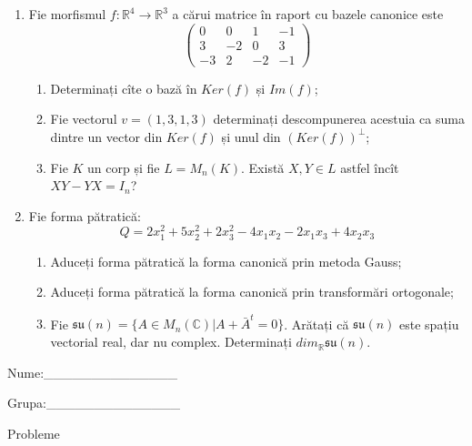 \documentclass{article}
\begin{document}
\begin{enumerate}
 \item Fie morfismul $f:\mathbb{R}^4 \to \mathbb{R}^3$ a cărui matrice în raport cu bazele canonice este
$$\begin{pmatrix}
0&0&1&-1\\
3&-2&0&3\\
-3&2&-2&-1
\end{pmatrix}$$

\begin{enumerate}
\item Determinați cîte o bază în $Ker(f)$ și $Im(f)$;
\item Fie vectorul $v=(1,3,1,3)$ determinați descompunerea acestuia ca suma dintre un vector din $Ker(f)$ și unul din $(Ker(f))^\perp$;
\item Fie $K$ un corp și fie $L=M_n(K)$. Există $X,Y \in L$ astfel încît $XY-YX=I_n$?  
\end{enumerate}
\item Fie forma pătratică:
$$Q= 2x_1^2+5x_2^2+2x_3^2-4x_1x_2-2x_1x_3+4x_2x_3$$

\begin{enumerate}
\item Aduceți forma pătratică la forma canonică prin metoda Gauss;
\item Aduceți forma pătratică la forma canonică prin transformări ortogonale;
\item Fie $\mathfrak{su}(n)=\{ A \in M_n(\mathbb{C}) | A+\bar{A}^t=0\}$. Arătați că $\mathfrak{su}(n)$ este spațiu vectorial real, dar nu complex.
Determinați $dim_{\mathbb{R}}\mathfrak{su}(n)$.
\end{enumerate}
\end{enumerate}
\newpage
\begin{flushright}
Nume:\_\_\_\_\_\_\_\_\_\_\_\_\_\_
 
 
Grupa:\_\_\_\_\_\_\_\_\_\_\_\_\_\_
\end{flushright}
\begin{center}
\vspace{2cm}
{\Large Probleme}
\vspace{2cm}
\end{center}
\end{document}
